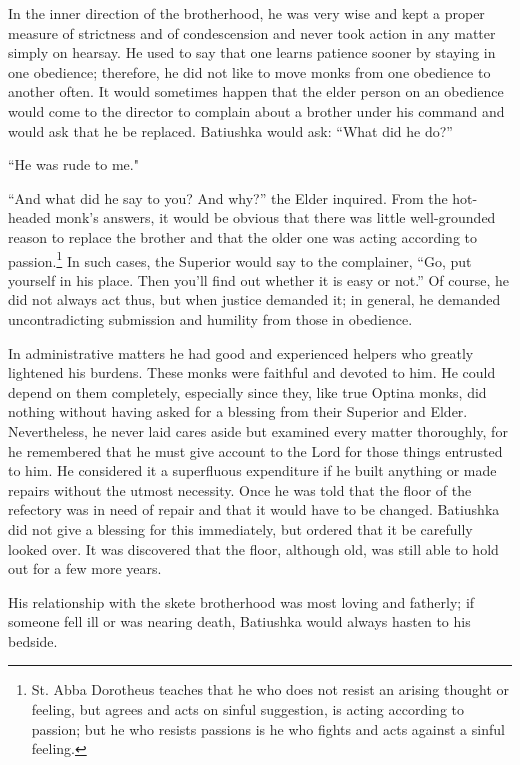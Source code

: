 In the inner direction of the brotherhood, he was very wise and kept a proper measure of strictness and of condescension and never took action in any matter simply on hearsay. He used to say that one learns patience sooner by staying in one obedience; therefore, he did not like to move monks from one obedience to another often. It would sometimes happen that the elder person on an obedience would come to the director to complain about a brother under his command and would ask that he be replaced. Batiushka would ask: “What did he do?”

“He was rude to me."

“And what did he say to you? And why?” the Elder inquired. From the hot-headed monk's answers, it would be obvious that there was little well-grounded reason to replace the brother and that the older one was acting according to passion.\footnote{St. Abba Dorotheus teaches that he who does not resist an arising thought or feeling, but agrees and acts on sinful suggestion, is acting according to passion; but he who resists passions is he who fights and acts against a sinful feeling.} In such cases, the Superior would say to the complainer, “Go, put yourself in his place. Then you'll find out whether it is easy or not.” Of course, he did not always act thus, but when justice demanded it; in general, he demanded uncontradicting submission and humility from those in obedience.

In administrative matters he had good and experienced helpers who greatly lightened his burdens. These monks were faithful and devoted to him. He could depend on them completely, especially since they, like true Optina monks, did nothing without having asked for a blessing from their Superior and Elder. Nevertheless, he never laid cares aside but examined every matter thoroughly, for he remembered that he must give account to the Lord for those things entrusted to him. He considered it a superfluous expenditure if he built anything or made repairs without the utmost necessity. Once he was told that the floor of the refectory was in need of repair and that it would have to be changed. Batiushka did not give a blessing for this immediately, but ordered that it be carefully looked over. It was discovered that the floor, although old, was still able to hold out for a few more years.

His relationship with the skete brotherhood was most loving and fatherly; if someone fell ill or was nearing death, Batiushka would always hasten to his bedside.

